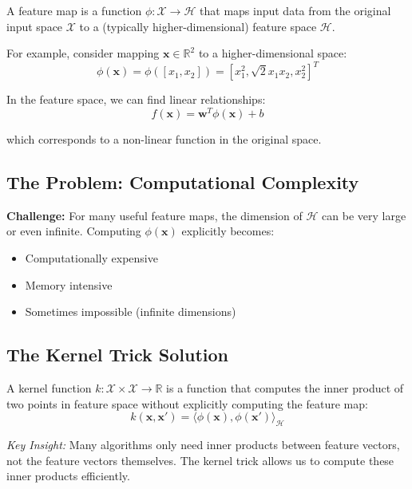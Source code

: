 \documentclass{tufte-handout}
\begin{document}
A feature map is a function $\phi: \mathcal{X} \rightarrow \mathcal{H}$ that maps input data from the original input space $\mathcal{X}$ to a (typically higher-dimensional) feature space $\mathcal{H}$.


For example, consider mapping $\mathbf{x} \in \mathbb{R}^2$ to a higher-dimensional space:
\begin{equation}
\phi(\mathbf{x}) = \phi([x_1, x_2]) = [x_1^2, \sqrt{2}x_1x_2, x_2^2]^T
\end{equation}

In the feature space, we can find linear relationships:
\begin{equation}
f(\mathbf{x}) = \mathbf{w}^T\phi(\mathbf{x}) + b
\end{equation}

which corresponds to a non-linear function in the original space.

\subsection{The Problem: Computational Complexity}

\textbf{Challenge:} For many useful feature maps, the dimension of $\mathcal{H}$ can be very large or even infinite. Computing $\phi(\mathbf{x})$ explicitly becomes:
\begin{itemize}
    \item Computationally expensive
    \item Memory intensive
    \item Sometimes impossible (infinite dimensions)
\end{itemize}

\subsection{The Kernel Trick Solution}


A kernel function $k: \mathcal{X} \times \mathcal{X} \rightarrow \mathbb{R}$ is a function that computes the inner product of two points in feature space without explicitly computing the feature map:
\begin{equation}
k(\mathbf{x}, \mathbf{x}') = \langle \phi(\mathbf{x}), \phi(\mathbf{x}') \rangle_{\mathcal{H}}
\end{equation}


\textit{Key Insight:} Many algorithms only need inner products between feature vectors, not the feature vectors themselves. The kernel trick allows us to compute these inner products efficiently.
\end{document}
